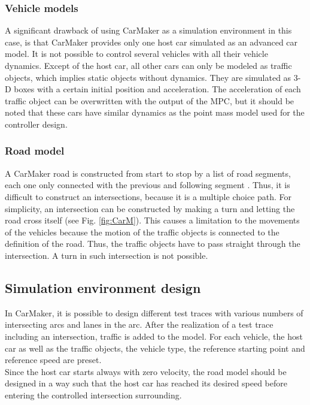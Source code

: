 \documentclass[letterpaper,10pt,conference]{ieeeconf}
\begin{document}
\subsubsection{Vehicle models}
A significant drawback of using CarMaker as a simulation environment in this case, is that CarMaker provides only one host car simulated as an advanced car model. It is not possible to control several vehicles with all their vehicle dynamics. Except of the host car, all other cars can only be modeled as traffic objects, which implies static objects without dynamics. They are simulated as 3-D boxes with a certain initial position and acceleration. The acceleration of each traffic object can be overwritten with the output of the MPC, but it should be noted that these cars have similar dynamics as the point mass model used for the controller design.
\subsubsection{Road model}
A CarMaker road is constructed from start to stop by a list of road segments, each one only connected with the previous and following segment \cite{guide}. Thus, it is difficult to construct an intersections, because it is a multiple choice path. For simplicity, an intersection can be constructed by making a turn and letting the road cross itself (see Fig. \ref{fig:CarM}). This causes a limitation to the movements of the vehicles because the motion of the traffic objects is connected to the definition of the road. Thus, the traffic objects have to pass straight through the intersection. A turn in such intersection is not possible.
\subsection{Simulation environment design}
In CarMaker, it is possible to design different test traces with various numbers of intersecting arcs and lanes in the arc. After the realization of a test trace including an intersection, traffic is added to the model. For each vehicle, the host car as well as the traffic objects, the vehicle type, the reference starting point and reference speed are preset.\\
Since the host car starts always with zero velocity, the road model should be designed in a way such that the host car has reached its desired speed before entering the controlled intersection surrounding.
\end{document}
